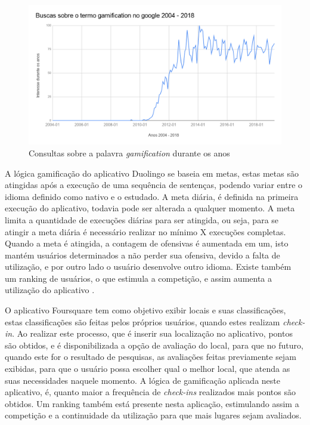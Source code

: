 \begin{figure}[H]
    \centering
    \includegraphics[scale=0.4]{src/imagens/cap1/gamification-google-trends.png}
    \caption{Consultas sobre a palavra \textit{gamification} durante os anos}
    \label{fig:gamification-google-trends}
\end{figure}

\par A lógica gamificação do aplicativo Duolingo se baseia em metas, estas metas são atingidas após a execução de uma sequência de sentenças, podendo variar entre o idioma definido como nativo e o estudado. A meta diária, é definida na primeira execução do aplicativo, todavia pode ser alterada a qualquer momento. A meta limita a quantidade de execuções diárias para ser atingida, ou seja, para se atingir a meta diária é necessário realizar no mínimo X execuções completas. Quando a meta é atingida, a contagem de ofensivas é aumentada em um, isto mantém usuários determinados a não perder sua ofensiva, devido a falta de utilização, e por outro lado o usuário desenvolve outro idioma. Existe também um ranking de usuários, o que estimula a competição, e assim aumenta a utilização do aplicativo \cite{melo2016eficiencia}.

\par O aplicativo Foursquare tem como objetivo exibir locais e suas classificações, estas classificações são feitas pelos próprios usuários, quando estes realizam \textit{check-in}. Ao realizar este processo, que é inserir sua localização no aplicativo, pontos são obtidos, e é disponibilizada a opção de avaliação do local, para que no futuro, quando este for o resultado de pesquisas, as avaliações feitas previamente sejam exibidas, para que o usuário possa escolher qual o melhor local, que atenda as suas necessidades naquele momento. A lógica de gamificação aplicada neste aplicativo, é, quanto maior a frequência de \textit{check-ins} realizados mais pontos são obtidos. Um ranking também está presente nesta aplicação, estimulando assim a competição e a continuidade da utilização para que mais lugares sejam avaliados\cite{huotari2012defining}.

